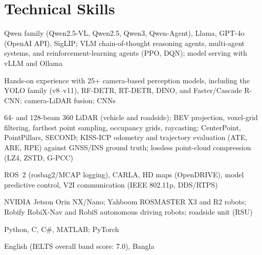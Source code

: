 \documentclass[11pt,letterpaper]{article}
\newenvironment{labelled}[1][5.2em]
  {\begin{description}[leftmargin=#1, labelwidth=\dimexpr#1-0.5em\relax,
                       labelsep=0.5em, align=left, font=\normalfont,
                       itemsep=2pt, topsep=1pt]}
  {\end{description}}
\begin{document}
\section{Technical Skills}
\begin{labelled}[10.4em]
  \item[Agentic AI \& LLMs:] Qwen family (Qwen2.5-VL, Qwen2.5, Qwen3,
    Qwen-Agent), Llama, GPT-4o (OpenAI API), SigLIP; VLM chain-of-thought
    reasoning agents, multi-agent systems, and reinforcement-learning agents
    (PPO, DQN); model serving with vLLM and Ollama
  \item[Perception \& ML:] Hands-on experience with 25+ camera-based perception
    models, including the YOLO family (v8--v11), RF-DETR, RT-DETR, DINO, and
    Faster/Cascade R-CNN; camera-LiDAR fusion; CNNs
  \item[LiDAR \& 3D:] 64- and 128-beam 360\textdegree{} LiDAR (vehicle and
    roadside); BEV projection, voxel-grid filtering, farthest point sampling,
    occupancy grids, raycasting; CenterPoint, PointPillars, SECOND; KISS-ICP
    odometry and trajectory evaluation (ATE, ARE, RPE) against GNSS/INS ground
    truth; lossless point-cloud compression (LZ4, ZSTD, G-PCC)
  \item[Autonomy \& Robotics:] ROS~2 (rosbag2/MCAP logging), CARLA, HD maps
    (OpenDRIVE), model predictive control, V2I communication (IEEE 802.11p,
    DDS/RTPS)
  \item[Platforms:] NVIDIA Jetson Orin NX/Nano; Yahboom ROSMASTER X3 and R2
    robots; Robify RobiX-Nav and RobiS autonomous driving robots; roadside unit
    (RSU)
  \item[Programming:] Python, C, C\#, MATLAB; PyTorch
  \item[Languages:] English (IELTS overall band score: 7.0), Bangla
\end{labelled}

\end{document}
